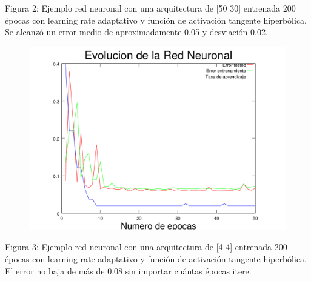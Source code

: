 \documentclass[%
    final,
    reprint,
    notitlepage,
    narroweqnarray,
    inline,
    twoside,
    invited
    ]{ieee}
\begin{document}
\begin{center}
\par Figura 2: Ejemplo red neuronal con una arquitectura de [50 30] entrenada 200 épocas con learning rate adaptativo y función de activación tangente hiperbólica. 
Se alcanzó un error medio de aproximadamente 0.05 y desviación 0.02.
\end{center}
\clearpage

\begin{figure}[H]
\begin{center}
\includegraphics[scale=0.70]{./images/9.png}
\label{modelado}
\end{center}
\end{figure}

\begin{center}
\par Figura 3: Ejemplo red neuronal con una arquitectura de [4 4] entrenada 200 épocas con learning rate adaptativo y función de activación tangente hiperbólica. 
El error no baja de más de 0.08 sin importar cuántas épocas itere.
\end{center}




\end{document}
